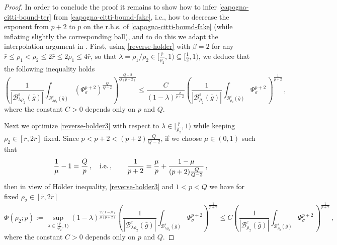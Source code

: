 \documentclass[10pt]{amsart}
\numberwithin{equation}{section}
\theoremstyle{definition}
\begin{document}
\begin{proof}
In order to conclude the proof it remains to show how to infer \eqref{capogna-citti-bound-ter} from \eqref{capogna-citti-bound-fake}, i.e., how to decrease the exponent from $p+2$ to $p$ on the r.h.s. of \eqref{capogna-citti-bound-fake} (while inflating slightly the corresponding ball), and to do this we adapt the interpolation argument in \cite[Lemma 3.38]{HKM}.
First, using \eqref{reverse-holder} with $\beta=2$ for any $\bar{r}\leq \rho_1<\rho_2 \leq 2 \bar{r}\leq 2 \rho_1  \leq 4\bar{r}$, so that $\lambda=\rho_1/\rho_2 \in [\frac{\bar{r}}{\rho_2},1) \subseteq [\frac12,1)$, we deduce that the following inequality holds
\begin{equation}
\label{reverse-holder3}
\left(  \frac{1}{|\mathcal{B}^\varepsilon_{\lambda\rho_2}(\bar{g})|}\int_{\mathcal{B}^\varepsilon_{\lambda \rho_2}(\bar{g})}  \left( \Psi_\sigma^{p+2} \right)^{\frac{Q}{Q-2}} \right)^{\frac{Q-2}{Q(p+2)}} \leq \frac{C }{(1-\lambda)^{\frac2{p+2}}}   \left( \frac{1}{|\mathcal{B}^\varepsilon_{\rho_2}(\bar{g})|}\int_{ \mathcal{B}_{ \rho_2}^\varepsilon(\bar{g})} \Psi_\sigma^{p+2} \, \right)^{\frac1{p+2}} 
\, ,
\end{equation}
where the constant $C>0$ depends only on $p$ and $Q$. 

Next we optimize \eqref{reverse-holder3} with respect to  $\lambda\in [\frac{\bar{r}}{\rho_2},1)$ while keeping  $\rho_2 \in [\bar{r},2\bar{r}]$ fixed. Since $p<p+2< (p+2)\frac{Q}{Q-2}$, if we choose $\mu\in (0,1)$ such that 
\begin{equation}
\label{interpexp} \frac1{\mu}-1= \frac{Q}p \, , \quad \hbox{i.e.} \, , \qquad \frac{1}{p+2}= \frac{\mu}{p}+\frac{1-\mu}{(p+2) \frac{Q}{Q-2}} \, , 
\end{equation}
then in view of H\"{o}lder inequality,  \eqref{reverse-holder3} and  $1<p<Q$ we have for fixed $\rho_2 \in [\bar{r},2\bar{r}]$ 
\begin{equation}
\label{def:Phip} 
\Phi(\rho_2;p):= \sup_{ \lambda\in [\frac{\bar{r}}{\rho_2},1)} (1-\lambda)^{\frac{2(1-\mu)}{\mu(p+2)}}   \left( \frac{1}{|\mathcal{B}^\varepsilon_{\lambda \rho_2}(\bar{g})|}\int_{ \mathcal{B}_{ \lambda \rho_2}^\varepsilon(\bar{g})} \Psi_\sigma^{p+2}  \right)^{\frac1{p+2}} \leq C  \left( \frac{1}{|\mathcal{B}^\varepsilon_{\rho_2}(\bar{g})|}\int_{ \mathcal{B}_{ \rho_2}^\varepsilon(\bar{g})} \Psi_\sigma^{p+2} \, \right)^{\frac1{p+2}}  \, ,
 \end{equation}
where the constant $C>0$ depends only on $p$ and $Q$.


\end{proof}
\end{document}

